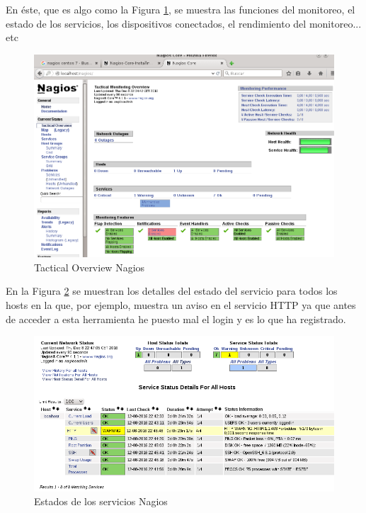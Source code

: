 En éste, que es algo como la Figura \ref{fig:figura136}, se muestra las funciones del monitoreo, el estado de los servicios, los dispositivos conectados, el rendimiento del monitoreo... etc

\begin{figure}[H]
	\centering
	\includegraphics[scale=0.48]{figuras/ejercicio12/figura18.png} 
	\caption{Tactical Overview Nagios} 
	\label{fig:figura136}
\end{figure}

En la Figura \ref{fig:figura137} se muestran los detalles del estado del servicio para todos los hosts en la que, por ejemplo, muestra un aviso en el servicio HTTP ya que antes de acceder a esta herramienta he puesto mal el login y es lo que ha registrado.

\begin{figure}[H]
	\centering
	\includegraphics[scale=0.6]{figuras/ejercicio12/figura20.png} 
	\caption{Estados de los servicios Nagios} 
	\label{fig:figura137}
\end{figure}

